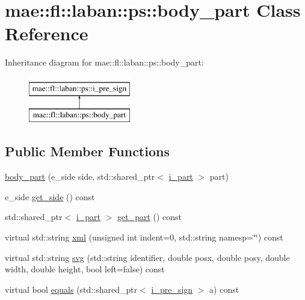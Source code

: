 \hypertarget{classmae_1_1fl_1_1laban_1_1ps_1_1body__part}{\section{mae\-:\-:fl\-:\-:laban\-:\-:ps\-:\-:body\-\_\-part Class Reference}
\label{classmae_1_1fl_1_1laban_1_1ps_1_1body__part}
}
Inheritance diagram for mae\-:\-:fl\-:\-:laban\-:\-:ps\-:\-:body\-\_\-part\-:\begin{figure}[H]
\begin{center}
\leavevmode
\includegraphics[height=2.000000cm]{classmae_1_1fl_1_1laban_1_1ps_1_1body__part}
\end{center}
\end{figure}
\subsection*{Public Member Functions}
\begin{DoxyCompactItemize}
\item 
\hyperlink{classmae_1_1fl_1_1laban_1_1ps_1_1body__part_a25f3ba48e88581c43d57de6d865c0aad}{body\-\_\-part} (e\-\_\-side side, std\-::shared\-\_\-ptr$<$ \hyperlink{classmae_1_1fl_1_1laban_1_1ps_1_1i__part}{i\-\_\-part} $>$ part)
\item 
e\-\_\-side \hyperlink{classmae_1_1fl_1_1laban_1_1ps_1_1body__part_afbfc05dba32b1790f6157bb8c3532b08}{get\-\_\-side} () const 
\item 
std\-::shared\-\_\-ptr$<$ \hyperlink{classmae_1_1fl_1_1laban_1_1ps_1_1i__part}{i\-\_\-part} $>$ \hyperlink{classmae_1_1fl_1_1laban_1_1ps_1_1body__part_a5a5daa5256abcf6372ff26710fcbb261}{get\-\_\-part} () const 
\item 
virtual std\-::string \hyperlink{classmae_1_1fl_1_1laban_1_1ps_1_1body__part_add0b077b3b062220ec16741b603e2747}{xml} (unsigned int indent=0, std\-::string namesp=\char`\"{}\char`\"{}) const 
\item 
virtual std\-::string \hyperlink{classmae_1_1fl_1_1laban_1_1ps_1_1body__part_aad8376f76f0cc424da8569ada4579c9a}{svg} (std\-::string identifier, double posx, double posy, double width, double height, bool left=false) const 
\item 
virtual bool \hyperlink{classmae_1_1fl_1_1laban_1_1ps_1_1body__part_abc74bc42375b203522754607f85851c4}{equals} (std\-::shared\-\_\-ptr$<$ \hyperlink{classmae_1_1fl_1_1laban_1_1ps_1_1i__pre__sign}{i\-\_\-pre\-\_\-sign} $>$ a) const 
\end{DoxyCompactItemize}


